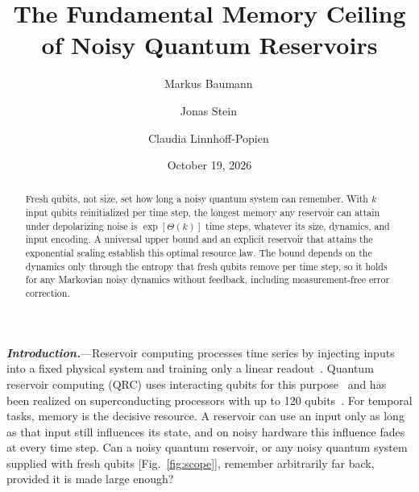 \documentclass[aps,prl,twocolumn,superscriptaddress,floatfix]{revtex4-2}
\theoremstyle{plain}
\newcommand{\runin}[1]{\textit{\textbf{#1}}---}
\begin{document}
\let\SMaddcontentsline\addcontentsline
\renewcommand{\addcontentsline}[3]{}

\title{The Fundamental Memory Ceiling of Noisy Quantum Reservoirs}

\author{Markus Baumann\,}
\author{Jonas Stein\,}
\author{Claudia Linnhoff-Popien\,}

\date{October 19, 2026}

\begin{abstract}
Fresh qubits, not size, set how long a noisy quantum system can remember. With $k$ input qubits reinitialized per time step, the longest memory any reservoir can attain under depolarizing noise is $\exp[\Theta(k)]$ time steps, whatever its size, dynamics, and input encoding. A universal upper bound and an explicit reservoir that attains the exponential scaling establish this optimal resource law. The bound depends on the dynamics only through the entropy that fresh qubits remove per time step, so it holds for any Markovian noisy dynamics without feedback, including measurement-free error correction.
\end{abstract}

\maketitle


\runin{Introduction.}Reservoir computing processes time series by injecting inputs into a fixed physical system and training only a linear readout~\cite{Jaeger2001,Maass2002,JaegerHaas2004,Lukosevicius2009,Tanaka2019}. Quantum reservoir computing (QRC) uses interacting qubits for this purpose~\cite{Fujii2017,Nakajima2019,Mujal2021} and has been realized on superconducting processors with up to 120 qubits~\cite{Chen2020,Suzuki2022,Yasuda2023,Hu2024,Monzani2024}. For temporal tasks, memory is the decisive resource. A reservoir can use an input only as long as that input still influences its state, and on noisy hardware this influence fades at every time step. Can a noisy quantum reservoir, or any noisy quantum system supplied with fresh qubits [Fig.~\ref{fig:scope}], remember arbitrarily far back, provided it is made large enough?
\end{document}
